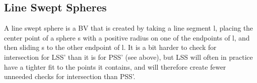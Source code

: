 \subsection{Line Swept Spheres}
A line swept sphere is a BV that is created by taking a line segment l, placing the center point of a sphere s with a positive radius on one of the endpoints of l, and then sliding s to the other endpoint of l. It is a bit harder to check for intersection for LSS' than it is for PSS' (see above), but LSS will often in practice have a tighter fit to the points it contains, and will therefore create fewer unneeded checks for intersection than PSS'.
